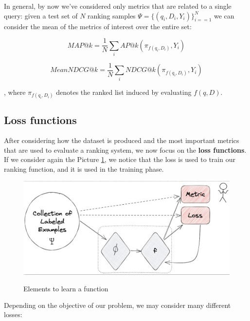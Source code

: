 In general, by now we've considered only metrics that are related to a single query: given a test set of $N$ ranking samples $\Psi = \{ (q_i, D_i, Y_i) \}_{i = =1}^N $ we can consider the mean of the metrics of interest over the entire set:


    $$
    MAP@k = \frac{1}{N} \sum_i AP@k(\pi_{f(q_i, D_i)}, Y_i)
    $$

    $$
    MeanNDCG@k = \frac{1}{N} \sum_i NDCG@k(\pi_{f(q_i, D_i)}, Y_i)
    $$

, where $\pi_{f(q_i, D_i)}$ denotes the ranked list induced by evaluating $f(q,D)$.

\subsection{Loss functions}
After considering how the dataset is produced and the most important metrics that are used to evaluate a ranking system, we now focus on the \textbf{loss functions}. If we consider again the Picture \ref{learning}, we notice that the loss is used to train our ranking function, and it is used in the training phase.

\begin{figure}[h!]
		\centering
		\includegraphics[scale = 1.5]{img/learning a function.jpg}
        \label{learning}
        \caption{Elements to learn a function}
\end{figure}

Depending on the objective of our problem, we may consider many different losses:

